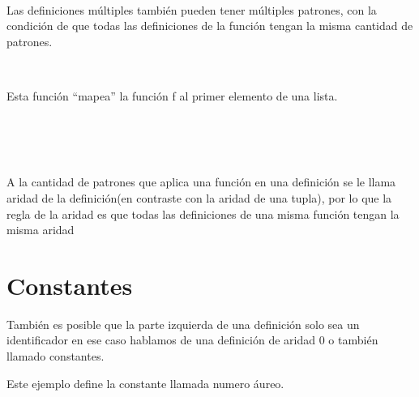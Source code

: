       \begin{fxcode}
         \\
      \end{fxcode}
      
      Las definiciones múltiples también pueden tener múltiples patrones, con la condición de que todas las definiciones de la función tengan la misma cantidad de patrones.
      
      \begin{fxcode}
         \\
      \end{fxcode}
      
      Esta función ``mapea'' la función f al primer elemento de una lista.
      
      \begin{fxcode}
         \\
         \\
         \\
         \outcode{[0.841470984807897, 2, 3, 4]}
      \end{fxcode}
      
      A la cantidad de patrones que aplica una función en una definición se le llama aridad de la definición(en contraste con la aridad de una tupla), por lo que la regla de la aridad es que todas las definiciones de una misma función tengan la misma aridad
      
   \section{Constantes}
      También es posible que la parte izquierda de una definición solo sea un identificador en ese caso hablamos de una definición de aridad 0 o también llamado constantes.
      
      \begin{fxcode}
      \end{fxcode}
      
      Este ejemplo define la constante llamada numero áureo.
      
      \begin{fxcode}
         \\
         \\
         \\
      \end{fxcode}
      
